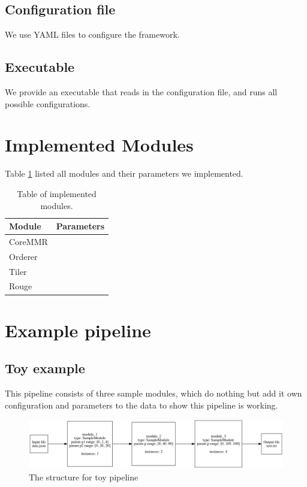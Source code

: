 \documentclass{article}
\begin{document}
    \subsection{Configuration file}
    We use YAML files to configure the framework.

    \subsection{Executable}
    We provide an executable that reads in the configuration file, and runs all possible configurations.

\section{Implemented Modules}

    Table \ref{tbl:modules} listed all modules and their parameters we implemented.

    \begin{table}[h]
        \centering
        \begin{tabular}{|l|l|}
            \hline
            Module  & Parameters \\ \hline
            CoreMMR &            \\ \hline
            Orderer &            \\ \hline
            Tiler   &            \\ \hline
            Rouge   &            \\ \hline
        \end{tabular}
        \caption{Table of implemented modules.}
        \label{tbl:modules}
    \end{table}

\section{Example pipeline}
    \subsection{Toy example}
    This pipeline consists of three sample modules,
    which do nothing but add it own configuration and parameters to the data to show this pipeline is working.

    \begin{figure}[H]
        \begin{center}
            \includegraphics[width=\textwidth]{fig/toy_pipeline.png}
        \end{center}
        \label{fig:toy_pipeline}
        \caption{The structure for toy pipeline}
    \end{figure}
\end{document}
